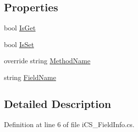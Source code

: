 \subsection*{Properties}
\begin{DoxyCompactItemize}
\item 
bool \hyperlink{classi_c_s___field_info_a98926fd021735f22ddff072992539fb6}{Is\+Get}
\item 
bool \hyperlink{classi_c_s___field_info_ac8cf221caf63b121284558b8e6916def}{Is\+Set}
\item 
override string \hyperlink{classi_c_s___field_info_a0ad07f85cf3066f3a5e409031a59b3ae}{Method\+Name}
\item 
string \hyperlink{classi_c_s___field_info_afe5329490e9923b7a1eeefa4c99e53d2}{Field\+Name}
\end{DoxyCompactItemize}


\subsection{Detailed Description}


Definition at line 6 of file i\+C\+S\+\_\+\+Field\+Info.\+cs.



